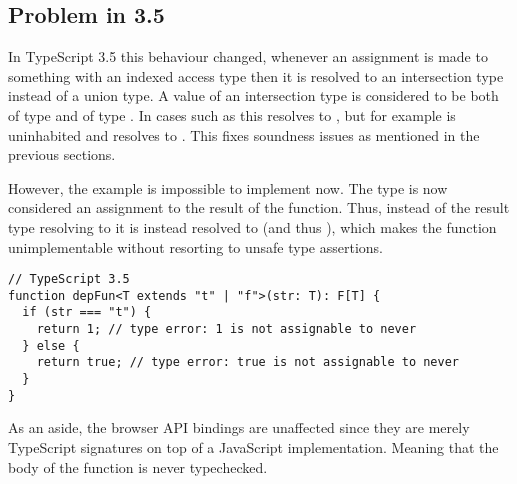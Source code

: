 % 

\subsection{Problem in 3.5}

In TypeScript 3.5 this behaviour changed, whenever an assignment is made to something with an indexed access type then it is resolved to an intersection type instead of a union type. A value of an intersection type  is considered to be both of type  and of type . In cases such as  this resolves to , but for example  is uninhabited and resolves to . This fixes soundness issues as mentioned in the previous sections.

However, the  example is impossible to implement now. The type  is now considered an assignment to the result of the function. Thus, instead of the result type resolving to  it is instead resolved to  (and thus ), which makes the function unimplementable without resorting to unsafe type assertions.

\begin{lstlisting}
// TypeScript 3.5
function depFun<T extends "t" | "f">(str: T): F[T] {
  if (str === "t") {
    return 1; // type error: 1 is not assignable to never
  } else {
    return true; // type error: true is not assignable to never
  }
}
\end{lstlisting}

As an aside, the browser API bindings are unaffected since they are merely TypeScript signatures on top of a JavaScript implementation. Meaning that the body of the function is never typechecked.

